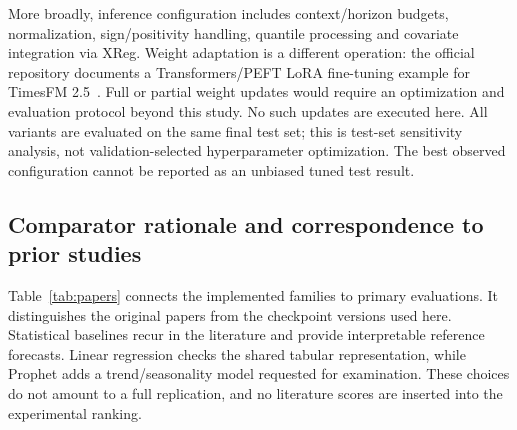 More broadly, inference configuration includes context/horizon budgets, normalization, sign/positivity handling, quantile processing and covariate integration via XReg. Weight adaptation is a different operation: the official repository documents a Transformers/PEFT LoRA fine-tuning example for TimesFM 2.5~\cite{timesfm_repo}. Full or partial weight updates would require an optimization and evaluation protocol beyond this study. No such updates are executed here. All variants are evaluated on the same final test set; this is test-set sensitivity analysis, not validation-selected hyperparameter optimization. The best observed configuration cannot be reported as an unbiased tuned test result.

\subsection{Comparator rationale and correspondence to prior studies}\label{sec:comparators}
Table~\ref{tab:papers} connects the implemented families to primary evaluations. It distinguishes the original papers from the checkpoint versions used here. Statistical baselines recur in the literature and provide interpretable reference forecasts. Linear regression checks the shared tabular representation, while Prophet adds a trend/seasonality model requested for examination. These choices do not amount to a full replication, and no literature scores are inserted into the experimental ranking.

